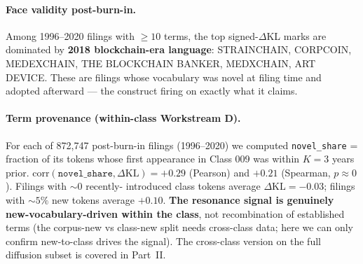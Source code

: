 \documentclass[11pt]{report}
\begin{document}
\paragraph{Face validity post-burn-in.} Among 1996--2020 filings with $\geq 10$
terms, the top signed-$\Delta$KL marks are dominated by \textbf{2018
blockchain-era language}: STRAINCHAIN, CORPCOIN, MEDEXCHAIN, THE BLOCKCHAIN
BANKER, MEDXCHAIN, ART DEVICE. These are filings whose vocabulary was novel
at filing time and adopted afterward --- the construct firing on exactly what
it claims.

\paragraph{Term provenance (within-class Workstream D).} For each of 872{,}747
post-burn-in filings (1996--2020) we computed \texttt{novel\_share} = fraction
of its tokens whose first appearance in Class 009 was within $K=3$ years prior.
$\mathrm{corr}(\texttt{novel\_share}, \Delta\mathrm{KL}) = \mathbf{+0.29}$
(Pearson) and $+0.21$ (Spearman, $p \approx 0$). Filings with $\sim 0$ recently-
introduced class tokens average $\Delta\mathrm{KL} = -0.03$; filings with $\sim
5\%$ new tokens average $+0.10$. \textbf{The resonance signal is genuinely
new-vocabulary-driven within the class}, not recombination of established
terms (the corpus-new vs class-new split needs cross-class data; here we can
only confirm new-to-class drives the signal). The cross-class version on the
full diffusion subset is covered in Part~II.
\end{document}
